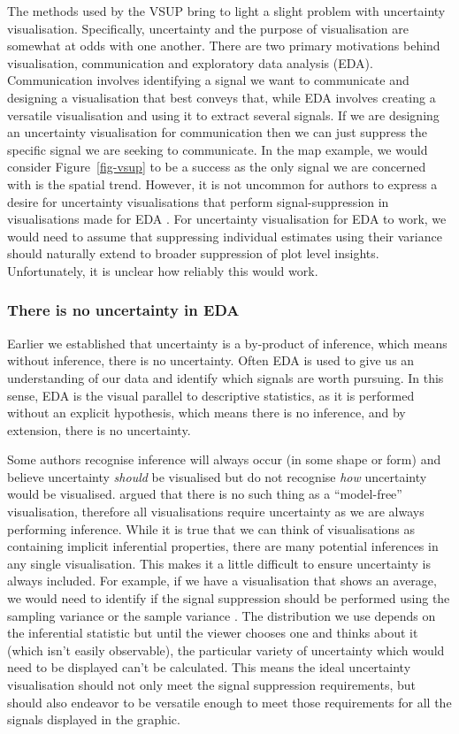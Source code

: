 \documentclass[
  12pt]{article}
\begin{document}
The methods used by the VSUP bring to light a slight problem with
uncertainty visualisation. Specifically, uncertainty and the purpose of
visualisation are somewhat at odds with one another. There are two
primary motivations behind visualisation, communication and exploratory
data analysis (EDA). Communication involves identifying a signal we want
to communicate and designing a visualisation that best conveys that,
while EDA involves creating a versatile visualisation and using it to
extract several signals. If we are designing an uncertainty
visualisation for communication then we can just suppress the specific
signal we are seeking to communicate. In the map example, we would
consider Figure~\ref{fig-vsup} to be a success as the only signal we are
concerned with is the spatial trend. However, it is not uncommon for
authors to express a desire for uncertainty visualisations that perform
signal-suppression in visualisations made for EDA
\citep{Sarma2024, Griethe2006}. For uncertainty visualisation for EDA to
work, we would need to assume that suppressing individual estimates
using their variance should naturally extend to broader suppression of
plot level insights. Unfortunately, it is unclear how reliably this
would work.

\subsubsection{There is no uncertainty in
EDA}\label{there-is-no-uncertainty-in-eda}

Earlier we established that uncertainty is a by-product of inference,
which means without inference, there is no uncertainty. Often EDA is
used to give us an understanding of our data and identify which signals
are worth pursuing. In this sense, EDA is the visual parallel to
descriptive statistics, as it is performed without an explicit
hypothesis, which means there is no inference, and by extension, there
is no uncertainty.

Some authors recognise inference will always occur (in some shape or
form) and believe uncertainty \emph{should} be visualised but do not
recognise \emph{how} uncertainty would be visualised.
\citet{Hullman2021} argued that there is no such thing as a
``model-free'' visualisation, therefore all visualisations require
uncertainty as we are always performing inference. While it is true that
we can think of visualisations as containing implicit inferential
properties, there are many potential inferences in any single
visualisation. This makes it a little difficult to ensure uncertainty is
always included. For example, if we have a visualisation that shows an
average, we would need to identify if the signal suppression should be
performed using the sampling variance or the sample variance
\citep{Hofman2020}. The distribution we use depends on the inferential
statistic but until the viewer chooses one and thinks about it (which
isn't easily observable), the particular variety of uncertainty which
would need to be displayed can't be calculated. This means the ideal
uncertainty visualisation should not only meet the signal suppression
requirements, but should also endeavor to be versatile enough to meet
those requirements for all the signals displayed in the graphic.
\end{document}
